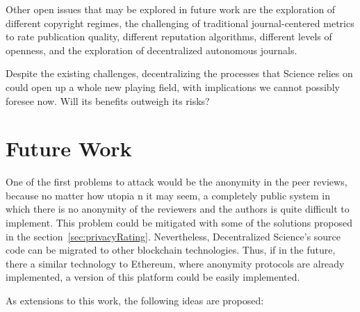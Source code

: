 Other open issues that may be explored in future work are the exploration of
different copyright regimes, the challenging of traditional journal-centered
metrics to rate publication quality, different reputation algorithms, different
levels of openness, and the exploration of decentralized autonomous journals.

Despite the existing challenges, decentralizing the processes that Science
relies on could open up a whole new playing field, with implications we cannot
possibly foresee now. Will its benefits outweigh its risks?

\section{Future Work}

One of the first problems to attack would be the anonymity in the peer reviews,
because no matter how utopia n it may seem, a completely public system in which
there is no anonymity of the reviewers and the authors is quite difficult to
implement. This problem could be mitigated with some of the solutions proposed
in the section~\ref{sec:privacyRating}. Nevertheless, Decentralized Science's
source code can be migrated to other blockchain technologies. Thus, if in the
future, there a similar technology to Ethereum, where anonymity protocols are
already implemented, a version of this platform could be easily implemented.

As extensions to this work, the following ideas are proposed:

